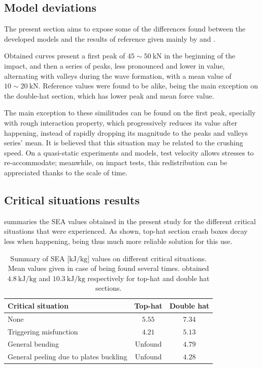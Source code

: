 \documentclass[cmfonts]{witpress}
\begin{document}
\subsection{Model deviations}
The present section aims to expose some of the differences found between the developed models and the results of reference given mainly by \cite{Scattina2011} and \cite{Peroni2009}.

Obtained curves present a first peak of $\num{45}\sim\SI{50}{\kN}$ in the beginning of the impact, and then a series of peaks, less pronounced and lower in value, alternating with valleys during the wave formation, with a mean value of $\num{10}\sim\SI{20}{\kN}$. Reference values were found to be alike, being the main exception on the double-hat section, which has lower peak and mean force value.

The main exception to these similitudes can be found on the first peak, specially with rough interaction property, which progressively reduces its value after happening, instead of rapidly dropping its magnitude to the peaks and valleys series' mean. It is believed that this situation may be related to the crushing speed. On a quasi-static experiments and models, test velocity allows stresses to re-accommodate; meanwhile, on impact tests, this redistribution can be appreciated thanks to the scale of time.

\subsection{Critical situations results}

 summaries the SEA values obtained in the present study for the different critical situations that were experienced. As shown, top-hat section crash boxes decay less when happening, being thus much more reliable solution for this use.

\begin{table}
	\centering
	\begin{tabular}{lcc}
		\hline
		Critical situation 						& Top-hat 		& Double hat 	\\
		\hline
		None 									& $\num{5.55}$	& $\num{7.34}$ 	\\
		Triggering misfunction 					& $\num{4.21}$	& $\num{5.13}$ 	\\
		General bending 						& Unfound		& $\num{4.79}$ 	\\
		General peeling due to plates buckling 	& Unfound		& $\num{4.28}$ 	\\
		\hline
	\end{tabular}
	\caption[Summary of SEA values on different critical situations.]{Summary of SEA [$\si{\kJ/\kg}$] values on different critical situations. Mean values given in case of being found several times. \cite{Peroni2009} obtained $\SI{4.8}{\kJ/\kg}$ and $\SI{10.3}{\kJ/\kg}$ respectively for top-hat and double hat sections.}
	\label{tab:critical_sits}
\end{table}
\end{document}
